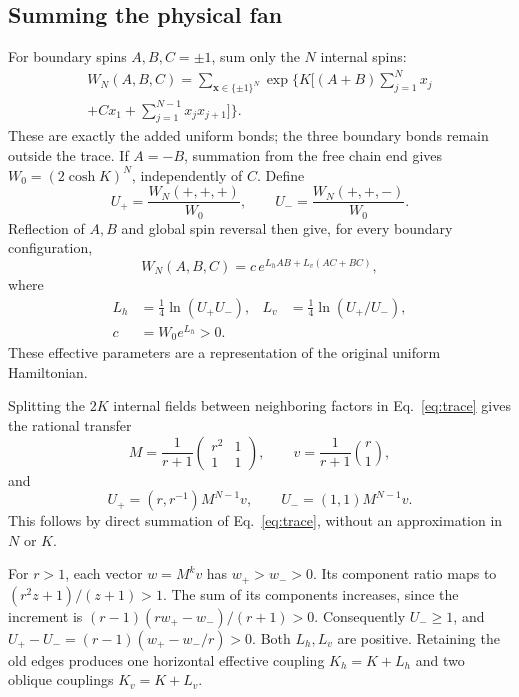 \documentclass[aps,pre,reprint,amsmath,amssymb,nofootinbib,longbibliography,floatfix]{revtex4-2}
\begin{document}
\subsection{Summing the physical fan}
For boundary spins \(A,B,C=\pm1\), sum only the \(N\) internal spins:
\begin{equation}
\begin{split}
 W_N(A,B,C)=\sum_{\boldsymbol x\in\{\pm1\}^N}
 \exp\!\bigg\{K\bigg[
  (A+B)\sum_{j=1}^N x_j\\
  +C x_1+\sum_{j=1}^{N-1}x_jx_{j+1}\bigg]\bigg\}.
\end{split}
\label{eq:trace}
\end{equation}
These are exactly the added uniform bonds; the three boundary bonds remain outside the trace. If \(A=-B\), summation from the free chain end gives \(W_0=(2\cosh K)^N\), independently of \(C\). Define
\begin{equation}
 U_+=\frac{W_N(+,+,+)}{W_0},\qquad
 U_-=\frac{W_N(+,+,-)}{W_0}.
\end{equation}
Reflection of \(A,B\) and global spin reversal then give, for every boundary configuration,
\begin{equation}
 W_N(A,B,C)=c\,e^{L_h AB+L_v(AC+BC)},
 \label{eq:localidentity}
\end{equation}
where
\begin{equation}
\begin{aligned}
 L_h&=\tfrac14\ln(U_+U_-),&
 L_v&=\tfrac14\ln(U_+/U_-),\\
 c&=W_0e^{L_h}>0.
\end{aligned}
\end{equation}
These effective parameters are a representation of the original uniform Hamiltonian.

Splitting the \(2K\) internal fields between neighboring factors in Eq.~\eqref{eq:trace} gives the rational transfer
\begin{equation}
 M=\frac1{r+1}
 \begin{pmatrix}r^2&1\\1&1\end{pmatrix},\qquad
 v=\frac1{r+1}\binom r1,
\end{equation}
and
\begin{equation}
 U_+=(r,r^{-1})M^{N-1}v,\qquad
 U_-=(1,1)M^{N-1}v.
 \label{eq:transfer}
\end{equation}
This follows by direct summation of Eq.~\eqref{eq:trace}, without an approximation in \(N\) or \(K\).

For \(r>1\), each vector \(w=M^k v\) has \(w_+>w_->0\). Its component ratio maps to \((r^2z+1)/(z+1)>1\). The sum of its components increases, since the increment is \((r-1)(rw_+-w_-)/(r+1)>0\). Consequently \(U_-\geq1\), and \(U_+-U_-=(r-1)(w_+-w_-/r)>0\). Both \(L_h,L_v\) are positive. Retaining the old edges produces one horizontal effective coupling \(K_h=K+L_h\) and two oblique couplings \(K_v=K+L_v\).
\end{document}
